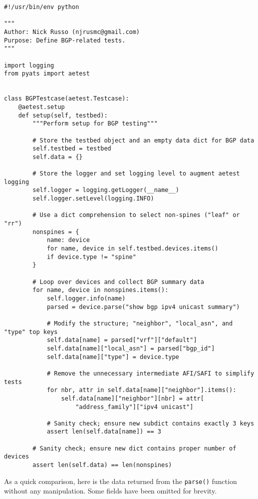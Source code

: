 \begin{verbatim}
#!/usr/bin/env python

"""
Author: Nick Russo (njrusmc@gmail.com)
Purpose: Define BGP-related tests.
"""

import logging
from pyats import aetest


class BGPTestcase(aetest.Testcase):
    @aetest.setup
    def setup(self, testbed):
        """Perform setup for BGP testing"""

        # Store the testbed object and an empty data dict for BGP data
        self.testbed = testbed
        self.data = {}

        # Store the logger and set logging level to augment aetest logging
        self.logger = logging.getLogger(__name__)
        self.logger.setLevel(logging.INFO)

        # Use a dict comprehension to select non-spines ("leaf" or "rr")
        nonspines = {
            name: device
            for name, device in self.testbed.devices.items()
            if device.type != "spine"
        }

        # Loop over devices and collect BGP summary data
        for name, device in nonspines.items():
            self.logger.info(name)
            parsed = device.parse("show bgp ipv4 unicast summary")

            # Modify the structure; "neighbor", "local_asn", and "type" top keys
            self.data[name] = parsed["vrf"]["default"]
            self.data[name]["local_asn"] = parsed["bgp_id"]
            self.data[name]["type"] = device.type

            # Remove the unnecessary intermediate AFI/SAFI to simplify tests
            for nbr, attr in self.data[name]["neighbor"].items():
                self.data[name]["neighbor"][nbr] = attr[
                    "address_family"]["ipv4 unicast"]

            # Sanity check; ensure new subdict contains exactly 3 keys
            assert len(self.data[name]) == 3

        # Sanity check; ensure new dict contains proper number of devices
        assert len(self.data) == len(nonspines)
\end{verbatim}

As a quick comparison, here is the data returned from the \verb|parse()|
function without any manipulation. Some fields have been omitted for brevity.

